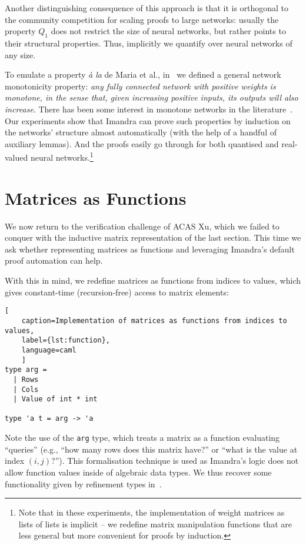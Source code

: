 \documentclass[runningheads]{llncs}
\begin{document}
Another distinguishing consequence of this approach is that it is orthogonal to
the community competition for scaling proofs to large networks: usually the
property $Q_1$ does not restrict the size of neural networks, but rather points
to their structural properties. Thus, implicitly we quantify over neural
networks of any size.

To emulate a property \emph{\`a la} de Maria et al.,  in~\cite{DPKD22} we  defined a general network monotonicity property: \emph{any fully connected
network with positive weights is \emph{monotone}, in the sense that, given
increasing positive inputs, its outputs will also increase}. There has been some
interest in monotone networks in the literature~\cite{JS98,WehenkelL19}.
Our experiments show that Imandra can prove such properties by induction on the networks'
structure almost automatically (with the help of a handful of auxiliary lemmas). And the proofs easily go through for both quantised and real-valued neural networks.\footnote{Note that in these experiments, the implementation of weight matrices as lists of lists is implicit -- we redefine matrix manipulation functions that are less general but more convenient for proofs by induction.}


\section{Matrices as Functions} \label{sec:function}

We now return to the verification challenge of ACAS Xu, which we failed to
conquer with the inductive matrix representation of the last section. This time
we ask whether representing matrices as functions and leveraging Imandra's
default proof automation can help.

With this in mind, we redefine matrices as functions from indices to values, which gives
constant-time (recursion-free) access to matrix elements:

\begin{lstlisting}[
	caption=Implementation of matrices as functions from indices to values,
	label={lst:function},
	language=caml
	]
type arg =
  | Rows
  | Cols
  | Value of int * int

type 'a t = arg -> 'a
\end{lstlisting}

Note the use of the \lstinline{arg} type, which treats a matrix as a function evaluating ``queries'' (e.g., ``how many rows does this matrix have?'' or ``what is the value at index $(i,j)$?''). This formalisation technique is used as Imandra's logic does not allow function values inside of algebraic data types. %
We thus recover some functionality given by refinement types in~\cite{KokkeKKAA20}.  
\end{document}
